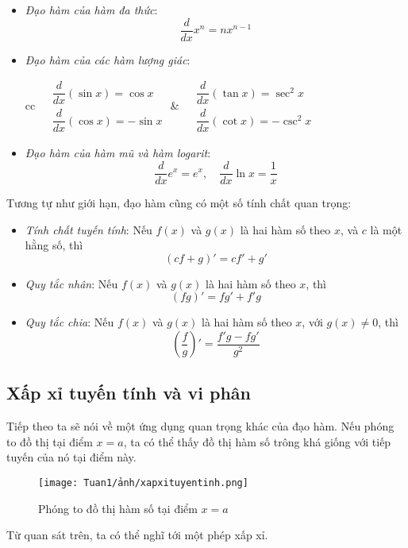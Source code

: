 \begin{itemize}
\item\textit{Đạo hàm của hàm đa thức}:
\begin{equation}
    \frac{d}{dx}x^n=nx^{n-1}
\end{equation}
\item\textit{Đạo hàm của các hàm lượng giác}:
\begin{center}
\begin{tabular}{cc}
\(
\begin{aligned}
    &\dfrac{d}{dx}(\sin x)=\cos x\\
    &\dfrac{d}{dx}(\cos x)=-\sin x
\end{aligned}
\)
&
\(
\begin{aligned}
    &\dfrac{d}{dx}(\tan x)=\sec^2 x\\
    &\dfrac{d}{dx}(\cot x)=-\csc^2 x
\end{aligned}
\)
\end{tabular}
\end{center}
\item\textit{Đạo hàm của hàm mũ và hàm logarit}:
\begin{equation}
    \frac{d}{dx}e^x=e^x,\quad \frac{d}{dx}\ln x=\frac{1}{x}
\end{equation}
\end{itemize}

Tương tự như giới hạn, đạo hàm cũng có một số tính chất quan trọng:
\begin{itemize}
    \item \textit{Tính chất tuyến tính}: Nếu $f(x)$ và $g(x)$ là hai hàm số theo $x$, và $c$ là một hằng số, thì
    \begin{equation}
        (cf+g)'=cf'+g'
    \end{equation}
    \item \textit{Quy tắc nhân}: Nếu $f(x)$ và $g(x)$ là hai hàm số theo $x$, thì
    \begin{equation}
        (fg)'=fg'+f'g
    \end{equation}
    \item \textit{Quy tắc chia}: Nếu $f(x)$ và $g(x)$ là hai hàm số theo $x$, với $g(x)\neq 0$, thì
    \begin{equation}
        \left(\frac{f}{g}\right)'=\frac{f'g-fg'}{g^2}
    \end{equation}
\end{itemize}
\subsection{Xấp xỉ tuyến tính và vi phân}
Tiếp theo ta sẽ nói về một ứng dụng quan trọng khác của đạo hàm. Nếu phóng to đồ thị tại điểm $x=a$, ta có thể thấy đồ thị hàm số trông khá giống với tiếp tuyến của nó tại điểm này.
\begin{figure}[H]
\centering
\texttt{[image: Tuan1/ảnh/xapxituyentinh.png]}
\caption{Phóng to đồ thị hàm số tại điểm $x=a$}
\end{figure}
Từ quan sát trên, ta có thể nghĩ tới một phép xấp xỉ.

